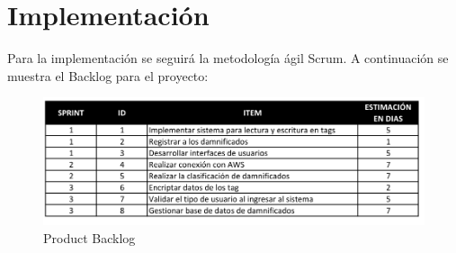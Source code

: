 \documentclass[11pt,openany]{book}
\begin{document}
	\section{Implementación}
	Para la implementación se seguirá la metodología ágil Scrum. A continuación se muestra el Backlog para el proyecto:
	\newpage
	\begin{figure}[htbp]
			\centering
			\includegraphics[width=1\textwidth]{imagenes/sprint.PNG}
			\caption{Product Backlog}
			\label{Product_Backlog}
	\end{figure}
	
	
	
\end{document}
